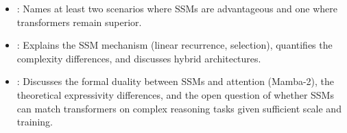 \begin{interviewq}

\goodgreat
\begin{itemize}
\item {}: Names at least two scenarios where SSMs are
  advantageous and one where transformers remain superior.
\item {}: Explains the SSM mechanism (linear recurrence,
  selection), quantifies the complexity differences, and discusses
  hybrid architectures.
\item {}: Discusses the formal duality between SSMs and
  attention (Mamba-2), the theoretical expressivity differences, and
  the open question of whether SSMs can match transformers on complex
  reasoning tasks given sufficient scale and training.
\end{itemize}

\end{interviewq}

